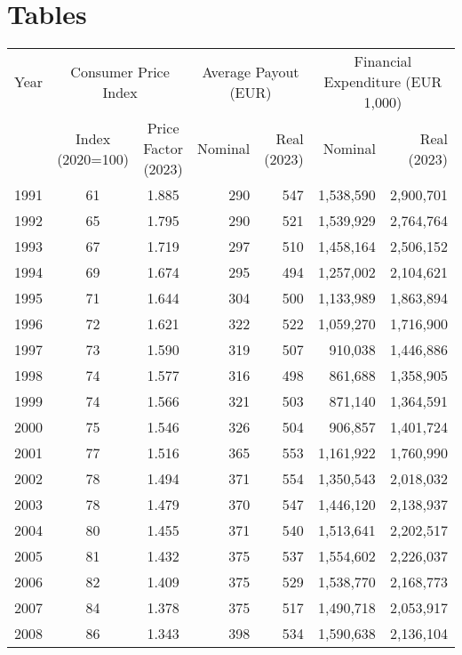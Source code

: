 \newpage
\section{Tables}
\renewcommand{\thetable}{\thesection \arabic{table}}
\setcounter{table}{0}

\begingroup
\setlength{\tabcolsep}{4pt}
\renewcommand{\arraystretch}{0.95}
  \begin{table}
  \centering
  \begin{tabular}{rcc|rr|rr}
  \toprule
  Year & \multicolumn{2}{c|}{Consumer Price Index} & \multicolumn{2}{c|}{Average Payout (EUR)} & \multicolumn{2}{c}{Financial Expenditure (EUR 1,000)} \\
  \cmidrule(lr){2-3} \cmidrule(lr){4-5} \cmidrule(l){6-7}
  & Index (2020=100) & Price Factor (2023) & Nominal & Real (2023) & Nominal & Real (2023) \\
  \midrule
  1991 & 61 & 1.885 & 290 & 547 & 1,538,590 & 2,900,701 \\
  1992 & 65 & 1.795 & 290 & 521 & 1,539,929 & 2,764,764 \\
  1993 & 67 & 1.719 & 297 & 510 & 1,458,164 & 2,506,152 \\
  1994 & 69 & 1.674 & 295 & 494 & 1,257,002 & 2,104,621 \\
  1995 & 71 & 1.644 & 304 & 500 & 1,133,989 & 1,863,894 \\
  1996 & 72 & 1.621 & 322 & 522 & 1,059,270 & 1,716,900 \\
  1997 & 73 & 1.590 & 319 & 507 & 910,038 & 1,446,886 \\
  1998 & 74 & 1.577 & 316 & 498 & 861,688 & 1,358,905 \\
  1999 & 74 & 1.566 & 321 & 503 & 871,140 & 1,364,591 \\
  2000 & 75 & 1.546 & 326 & 504 & 906,857 & 1,401,724 \\
  2001 & 77 & 1.516 & 365 & 553 & 1,161,922 & 1,760,990 \\
  2002 & 78 & 1.494 & 371 & 554 & 1,350,543 & 2,018,032 \\
  2003 & 78 & 1.479 & 370 & 547 & 1,446,120 & 2,138,937 \\
  2004 & 80 & 1.455 & 371 & 540 & 1,513,641 & 2,202,517 \\
  2005 & 81 & 1.432 & 375 & 537 & 1,554,602 & 2,226,037 \\
  2006 & 82 & 1.409 & 375 & 529 & 1,538,770 & 2,168,773 \\
  2007 & 84 & 1.378 & 375 & 517 & 1,490,718 & 2,053,917 \\
  2008 & 86 & 1.343 & 398 & 534 & 1,590,638 & 2,136,104 \\

\end{tabular}
\end{table}
